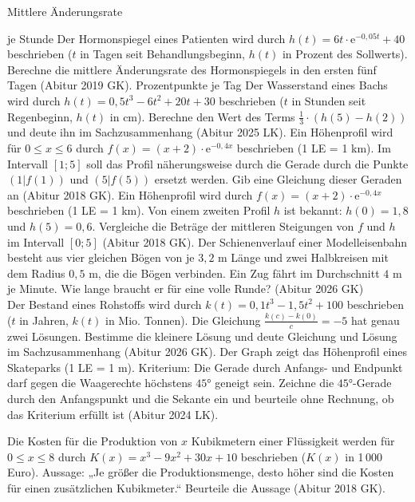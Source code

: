 \begin{aufgabe}{Mittlere Änderungsrate}
\begin{teile}
\leerfeld je Stunde
\teil Der Hormonspiegel eines Patienten wird durch $h(t) = 6t \cdot \mathrm{e}^{-0{,}05t} + 40$ beschrieben ($t$ in Tagen seit Behandlungsbeginn, $h(t)$ in Prozent des Sollwerts). Berechne die mittlere Änderungsrate des Hormonspiegels in den ersten fünf Tagen \hfill (Abitur 2019 GK). \leerfeld Prozentpunkte je Tag
\teil Der Wasserstand eines Bachs wird durch $h(t) = 0{,}5t^3 - 6t^2 + 20t + 30$ beschrieben ($t$ in Stunden seit Regenbeginn, $h(t)$ in cm). Berechne den Wert des Terms $\frac{1}{3} \cdot (h(5) - h(2))$ und deute ihn im Sachzusammenhang \hfill (Abitur 2025 LK).
\teil Ein Höhenprofil wird für $0 \le x \le 6$ durch $f(x) = (x + 2) \cdot \mathrm{e}^{-0{,}4x}$ beschrieben (1 LE = 1 km). Im Intervall $[1; 5]$ soll das Profil näherungsweise durch die Gerade durch die Punkte $(1 | f(1))$ und $(5 | f(5))$ ersetzt werden. Gib eine Gleichung dieser Geraden an \hfill (Abitur 2018 GK).
\teil Ein Höhenprofil wird durch $f(x) = (x + 2) \cdot \mathrm{e}^{-0{,}4x}$ beschrieben (1 LE = 1 km). Von einem zweiten Profil $h$ ist bekannt: $h(0) = 1{,}8$ und $h(5) = 0{,}6$. Vergleiche die Beträge der mittleren Steigungen von $f$ und $h$ im Intervall $[0; 5]$ \hfill (Abitur 2018 GK).
\teil Der Schienenverlauf einer Modelleisenbahn besteht aus vier gleichen Bögen von je $3{,}2$ m Länge und zwei Halbkreisen mit dem Radius $0{,}5$ m, die die Bögen verbinden. Ein Zug fährt im Durchschnitt $4$ m je Minute. Wie lange braucht er für eine volle Runde? \hfill (Abitur 2026 GK) \\ \leerfeld[min]
\teil Der Bestand eines Rohstoffs wird durch $k(t) = 0{,}1t^3 - 1{,}5t^2 + 100$ beschrieben ($t$ in Jahren, $k(t)$ in Mio. Tonnen). Die Gleichung $\frac{k(c) - k(0)}{c} = -5$ hat genau zwei Lösungen. Bestimme die kleinere Lösung und deute Gleichung und Lösung im Sachzusammenhang \hfill (Abitur 2026 GK).
\teil Der Graph zeigt das Höhenprofil eines Skateparks (1 LE = 1 m). Kriterium: Die Gerade durch Anfangs- und Endpunkt darf gegen die Waagerechte höchstens $45°$ geneigt sein. Zeichne die $45°$-Gerade durch den Anfangspunkt und die Sekante ein und beurteile ohne Rechnung, ob das Kriterium erfüllt ist \hfill (Abitur 2024 LK).

\begin{ksys}[xmin=0,xmax=4,ymin=0,ymax=4,ablesen]\end{ksys}
\teil Die Kosten für die Produktion von $x$ Kubikmetern einer Flüssigkeit werden für $0 \le x \le 8$ durch $K(x) = x^3 - 9x^2 + 30x + 10$ beschrieben ($K(x)$ in 1\,000 Euro). Aussage: „Je größer die Produktionsmenge, desto höher sind die Kosten für einen zusätzlichen Kubikmeter.“ Beurteile die Aussage \hfill (Abitur 2018 GK).
\end{teile}
\end{aufgabe}

